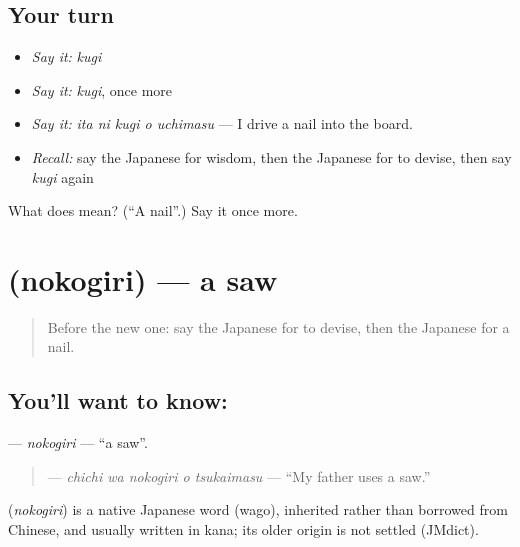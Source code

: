 \subsection*{Your turn}
\begin{itemize}
\raggedright
  \item \emph{Say it:} \emph{kugi}
  \item \emph{Say it:} \emph{kugi}, once more
  \item \emph{Say it:} \emph{ita ni kugi o uchimasu} — I drive a nail into the board.
  \item \emph{Recall:} say the Japanese for wisdom, then the Japanese for to devise, then say \emph{kugi} again
\end{itemize}

\begin{tcolorbox}[breakable,colback=teal!4,colframe=teal!35!black,title={Before you move on}]
What does  mean? (\textquotedblleft{}A nail\textquotedblright{}.) Say it once more.
\end{tcolorbox}
\section[\texorpdfstring{\ja{のこぎり} (nokogiri)}{のこぎり (nokogiri)}]{ (nokogiri) — a saw}

\label{lesson:JA-C482-nokogiri}



\begin{quote}
Before the new one: say the Japanese for to devise, then the Japanese for a nail.
\end{quote}

\subsection*{You'll want to know: }
\textbf{} — \emph{nokogiri} — \textquotedblleft{}a saw\textquotedblright{}.

\begin{quote}
\textbf{  } — \emph{chichi wa nokogiri o tsukaimasu} — \textquotedblleft{}My father uses a saw.\textquotedblright{}
\end{quote}

\begin{cousinweb}
\textbf{} (\emph{nokogiri}) is a native Japanese word (wago), inherited rather than borrowed from Chinese, and usually written in kana; its older origin is not settled (JMdict).
\end{cousinweb}

